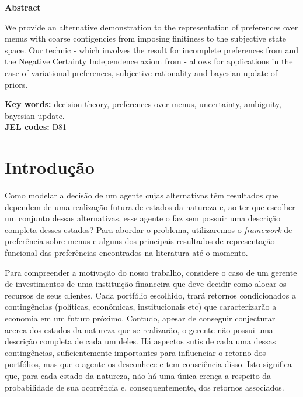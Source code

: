 \documentclass[12pt, a4paper]{article}
\theoremstyle{nonumberplain}
\theoremstyle{plain}
\theoremstyle{plain}
\theoremstyle{plain}
\theoremstyle{nonumberplain}
\begin{document}
\begin{titlepage}
\begin{center}
\textbf{\Large Abstract}
\end{center}
\vspace{1.5cm}
We provide an alternative demonstration to the representation of preferences over menus with coarse contigencies from \cite{Epstein2007} imposing finitiness to the subjective state space. Our technic - which involves the result for incomplete preferences from \cite{Kochov2007} and the Negative Certainty Independence axiom from \cite{Dil2010} - allows for applications in the case of variational preferences, subjective rationality and bayesian update of priors.  
\begin{flushleft}
\textbf{Key words:} decision theory, preferences over menus, uncertainty, ambiguity, bayesian update.\\

\textbf{JEL codes:} D81
\end{flushleft}
\end{titlepage}

\clearpage
\tableofcontents
\clearpage
\section{Introdução}
Como modelar a decisão de um agente cujas alternativas têm resultados que dependem de uma realização futura de estados da natureza e, ao ter que escolher um conjunto dessas alternativas, esse agente o faz sem possuir uma descrição completa desses estados? Para abordar o problema, utilizaremos o \emph{framework} de preferência sobre menus e alguns dos principais resultados de representação funcional das preferências encontrados na literatura até o momento.

Para compreender a motivação do nosso trabalho, considere o caso de um gerente de investimentos de uma instituição financeira que deve decidir como alocar os recursos de seus clientes. Cada portfólio escolhido, trará retornos condicionados a contingências (políticas, econômicas, institucionais etc) que caracterizarão a economia em um futuro próximo. Contudo, apesar de conseguir conjecturar acerca dos estados da natureza que se realizarão, o gerente não possui uma descrição completa de cada um deles. Há aspectos sutis de cada uma dessas contingências, suficientemente importantes para influenciar o retorno dos portfólios, mas que o agente os desconhece e tem consciência disso. Isto significa que, para cada estado da natureza, não há uma única crença a respeito da probabilidade de sua ocorrência e, consequentemente, dos retornos associados.
\end{document}
